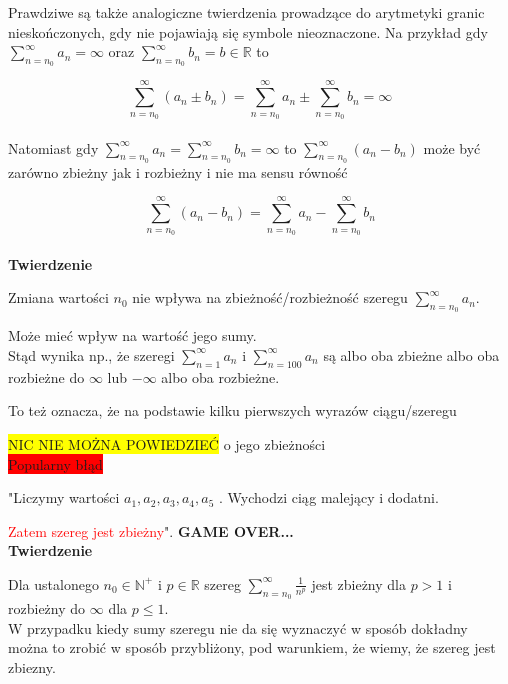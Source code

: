 Prawdziwe są także analogiczne twierdzenia prowadzące do arytmetyki granic nieskończonych, gdy nie pojawiają się symbole nieoznaczone.
Na przykład gdy $ \sum\limits_{n = n_0}^{\infty} a_n = \infty $ oraz $ \sum\limits_{n = n_0}^{\infty} b_n = b \in \mathbb{R} $ to 

$$ \sum\limits_{n = n_0}^{\infty} (a_n \pm b_n) = \sum\limits_{n = n_0}^{\infty} a_n \pm \sum\limits_{n = n_0}^{\infty} b_n = \infty $$ \\

Natomiast gdy $ \sum\limits_{n = n_0}^{\infty} a_n = \sum\limits_{n = n_0}^{\infty} b_n = \infty $ to
$ \sum\limits_{n = n_0}^{\infty} (a_n - b_n) $ może być zarówno zbieżny jak i rozbieżny i nie ma sensu równość

$$ \sum\limits_{n = n_0}^{\infty} (a_n - b_n) = \sum\limits_{n = n_0}^{\infty} a_n - \sum\limits_{n = n_0}^{\infty} b_n $$ \\

\textbf{Twierdzenie}

Zmiana wartości $n_0$ nie wpływa na zbieżność/rozbieżność szeregu $ \sum\limits_{n = n_0}^{\infty} a_n $.

Może mieć wpływ na wartość jego sumy. \\

Stąd wynika np., że szeregi $ \sum\limits_{n = 1}^{\infty} a_n $ i $ \sum\limits_{n = 100}^{\infty} a_n $ są albo oba zbieżne
albo oba rozbieżne do $ \infty $ lub $-\infty$ albo oba rozbieżne.

To też oznacza, że na podstawie kilku pierwszych wyrazów ciągu/szeregu

\colorbox{yellow}{NIC NIE MOŻNA POWIEDZIEĆ} o jego zbieżności \\

\colorbox{red}{Popularny błąd}

"Liczymy wartości $ a_1, a_2, a_3, a_4, a_5$ . Wychodzi ciąg malejący i dodatni.

\textcolor{red}{Zatem szereg jest zbieżny}". \textbf{GAME OVER...} \\

\textbf{Twierdzenie}

Dla ustalonego $ n_0 \in \mathbb{N}^+ $ i $ p \in \mathbb{R} $ szereg $ \sum\limits_{n = n_0}^{\infty} \frac{1}{n^p} $
jest zbieżny dla $ p > 1 $ i rozbieżny do $\infty$ dla $p \leq 1$.  \\

W przypadku kiedy sumy szeregu nie da się wyznaczyć w sposób dokładny można to zrobić w sposób przybliżony, pod warunkiem, że wiemy,
że szereg jest zbiezny. \\


